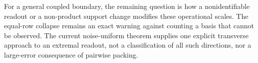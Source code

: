 For a general coupled boundary, the remaining question is how a
nonidentifiable readout or a non-product support change modifies these
operational scales. The equal-row collapse remains an exact warning
against counting a basis that cannot be observed. The current
noise-uniform theorem supplies one explicit transverse approach to an
extremal readout, not a classification of all such directions, nor a
large-error consequence of pairwise packing.
